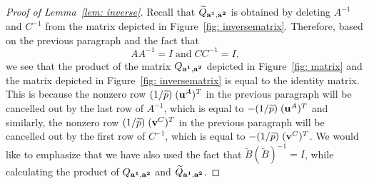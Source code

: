 \documentclass[10pt,a4paper]{amsart}
\begin{document}
\begin{proof} [Proof of Lemma~\ref{lem: inverse}]
Recall that $\widetilde{Q}_{{\bf a^1}, {\bf a^2}}$ is obtained by deleting $A^{-1}$ and $C^{-1}$ from the matrix depicted in Figure~\ref{fig: inversematrix}. Therefore, based on the previous paragraph and the fact that  $$AA^{-1}=I\;  \mbox{and} \; CC^{-1}=I,$$ we see that the product of the matrix $Q_{{\bf a^1}, {\bf a^2}}$ depicted in Figure~\ref{fig: matrix} and the matrix depicted in Figure~\ref{fig: inversematrix} is equal to the identity matrix. This is because the nonzero row  $(1/\widetilde{p})\; ({\bf u}^A)^T$ in the previous paragraph will be cancelled out by the last row of $A^{-1}$, which is equal to $-(1/\widetilde{p})\; ({\bf u}^A)^T$ and similarly, the nonzero row  $(1/\widetilde{p})\; ({\bf v}^C)^T$ in the previous paragraph will be cancelled out by the first row of $C^{-1}$, which is equal to $-(1/\widetilde{p})\; ({\bf v}^C)^T$. We would like to emphasize that we have also used the fact that $\widetilde{B}(\widetilde{B})^{-1}=I$, while calculating the product of $Q_{{\bf a^1}, {\bf a^2}}$ and $\widetilde{Q}_{{\bf a^1}, {\bf a^2}}$. 
\end{proof} 
\end{document}
